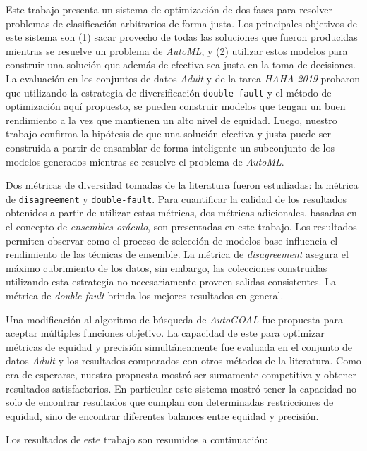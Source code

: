 \begin{conclusions}

Este trabajo presenta un sistema de optimización de dos fases para resolver problemas de clasificación arbitrarios de forma justa.
Los principales objetivos de este sistema son (1) sacar provecho de todas las soluciones que fueron producidas mientras se resuelve un problema de \emph{AutoML}, y (2) utilizar estos modelos para construir una solución que además de efectiva sea justa en la toma de decisiones.
La evaluación en los conjuntos de datos \emph{Adult} y de la tarea \emph{HAHA 2019} probaron que utilizando la estrategia de diversificación \texttt{double-fault} y el método de optimización aquí propuesto, se pueden construir modelos que tengan un buen rendimiento a la vez que mantienen un alto nivel de equidad.
Luego, nuestro trabajo confirma la hipótesis de que una solución efectiva y justa puede ser construida a partir de ensamblar de forma inteligente un subconjunto de los modelos generados mientras se resuelve el problema de \emph{AutoML}.

Dos métricas de diversidad tomadas de la literatura fueron estudiadas: la métrica de \texttt{disagreement} y \texttt{double-fault}.
Para cuantificar la calidad de los resultados obtenidos a partir de utilizar estas métricas, dos métricas adicionales, basadas en el concepto de \emph{ensembles oráculo}, son presentadas en este trabajo.
Los resultados permiten observar como el proceso de selección de modelos base influencia el rendimiento de las técnicas de ensemble.
La métrica de \emph{disagreement} asegura el máximo cubrimiento de los datos, sin embargo, las colecciones construidas utilizando esta estrategia no necesariamente proveen salidas consistentes.
La métrica de \emph{double-fault} brinda los mejores resultados en general.

Una modificación al algoritmo de búsqueda de \emph{AutoGOAL} fue propuesta para aceptar múltiples funciones objetivo.
La capacidad de este para optimizar métricas de equidad y precisión simultáneamente fue evaluada en el conjunto de datos \emph{Adult} y los resultados comparados con otros métodos de la literatura.
Como era de esperarse, nuestra propuesta mostró ser sumamente competitiva y obtener resultados satisfactorios.
En particular este sistema mostró tener la capacidad no solo de encontrar resultados que cumplan con determinadas restricciones de equidad, sino de encontrar diferentes balances entre equidad y precisión.

Los resultados de este trabajo son resumidos a continuación:


\end{conclusions}
